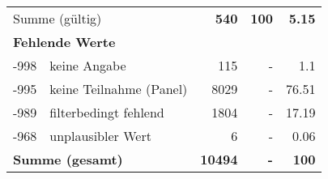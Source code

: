 \begin{longtable}{lXrrr}
     \midrule
     \multicolumn{2}{l}{Summe (gültig)} &
       \textbf{\num{540}} &
     \textbf{\num{100}} &
       \textbf{\num[round-mode=places,round-precision=2]{5.15}} \\
     \multicolumn{5}{l}{\textbf{Fehlende Werte}}\\
       -998 &
       keine Angabe &
         \num{115} &
        - &
         \num[round-mode=places,round-precision=2]{1.1} \\
       -995 &
       keine Teilnahme (Panel) &
         \num{8029} &
        - &
         \num[round-mode=places,round-precision=2]{76.51} \\
       -989 &
       filterbedingt fehlend &
         \num{1804} &
        - &
         \num[round-mode=places,round-precision=2]{17.19} \\
       -968 &
       unplausibler Wert &
         \num{6} &
        - &
         \num[round-mode=places,round-precision=2]{0.06} \\
     \midrule
     \multicolumn{2}{l}{\textbf{Summe (gesamt)}} &
          \textbf{\num{10494}} &
        \textbf{-} &
        \textbf{\num{100}} \\
     \bottomrule
     \end{longtable}
     
